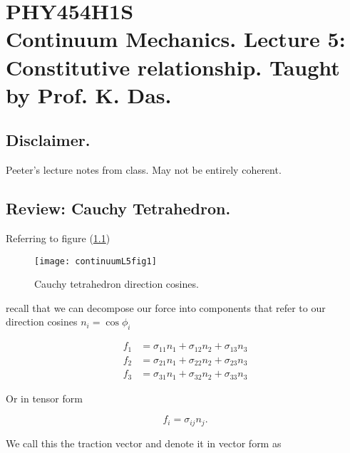 %
%

\chapter{PHY454H1S\\Continuum Mechanics.  Lecture 5: Constitutive relationship.  Taught by Prof. K. Das.}
\label{chap:continuumL5}
{}
\date{Jan 25, 2012}

\beginArtWithToc

\section{Disclaimer.}

Peeter's lecture notes from class.  May not be entirely coherent.

\section{Review: Cauchy Tetrahedron.}

Referring to figure (\ref{fig:continuumL5:continuumL5fig1})
\begin{figure}[htp]
   \centering
   \texttt{[image: continuumL5fig1]}
   \caption{Cauchy tetrahedron direction cosines.}\label{fig:continuumL5:continuumL5fig1}
\end{figure}

recall that we can decompose our force into components that refer to our direction cosines $n_i = \cos\phi_i$

\begin{align}\label{eqn:continuumL5:10}
f_1 &= \sigma_{11} n_1 + \sigma_{12} n_2 + \sigma_{13} n_3 \\
f_2 &= \sigma_{21} n_1 + \sigma_{22} n_2 + \sigma_{23} n_3 \\
f_3 &= \sigma_{31} n_1 + \sigma_{32} n_2 + \sigma_{33} n_3
\end{align}

Or in tensor form

\begin{equation}\label{eqn:continuumL5:30}
f_i = \sigma_{ij} n_j.
\end{equation}

We call this the traction vector and denote it in vector form as

